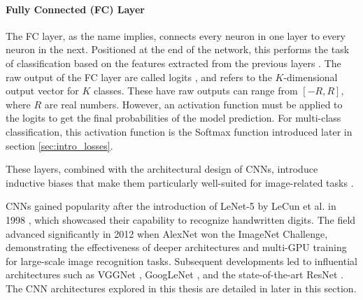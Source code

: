 \paragraph{Fully Connected (FC) Layer}
The FC layer, as the name implies, connects every neuron in one layer to every neuron in the next. Positioned at the end of the network, this performs the task of classification based on the features extracted from the previous layers \cite{cs231n}. The raw output of the FC layer are called logits \cite{arora2024logits}, and refers to the $K$-dimensional output vector for $K$ classes. These have raw outputs can range from $[-R,R]$, where $R$ are real numbers. However, an activation function must be applied to the logits to get the final probabilities of the model prediction. For multi-class classification, this activation function is the Softmax function introduced later in section \ref{sec:intro_losses}.
\vspace{1em}

\noindent These layers, combined with the architectural design of CNNs, introduce inductive biases that make them particularly well-suited for image-related tasks \cite{kim2020inductivebias}. 



CNNs gained popularity after the introduction of LeNet-5 by LeCun et al. in 1998 \cite{lecun1998}, which showcased their capability to recognize handwritten digits. The field advanced significantly in 2012 when AlexNet \cite{NIPS2012_c399862d} won the ImageNet Challenge, demonstrating the effectiveness of deeper architectures and multi-GPU training for large-scale image recognition tasks. Subsequent developments led to influential architectures such as VGGNet \cite{simonyan2015deepconvolutionalnetworkslargescale}, GoogLeNet \cite{szegedy2014goingdeeperconvolutions}, and the state-of-the-art ResNet \cite{he2015deepresiduallearningimage}. The CNN architectures explored in this thesis are detailed in later in this section.

